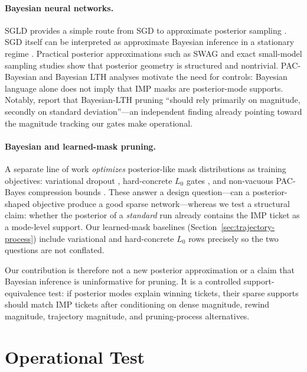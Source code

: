 \documentclass{article}
\begin{document}
\paragraph{Bayesian neural networks.}
SGLD provides a simple route from SGD to approximate posterior sampling
\citep{welling2011sgld}. SGD itself can be interpreted as approximate Bayesian
inference in a stationary regime \citep{mandt2017sgd}. Practical posterior
approximations such as SWAG \citep{maddox2019swag} and exact small-model
sampling studies \citep{izmailov2021posteriors} show that posterior geometry is
structured and nontrivial. PAC-Bayesian and Bayesian LTH analyses
\citep{sakamoto2022pacbayes, kuhn2026bayesian} motivate the need for controls:
Bayesian language alone does not imply that IMP masks are posterior-mode
supports. Notably, \citet{kuhn2026bayesian} report that Bayesian-LTH pruning
``should rely primarily on magnitude, secondly on standard deviation''---an
independent finding already pointing toward the magnitude tracking our gates
make operational.

\paragraph{Bayesian and learned-mask pruning.}
A separate line of work \emph{optimizes} posterior-like mask distributions as
training objectives: variational dropout \citep{molchanov2017variational},
hard-concrete $L_0$ gates \citep{louizos2018l0}, and non-vacuous PAC-Bayes
compression bounds \citep{dziugaite2017nonvacuous}. These answer a design
question---can a posterior-shaped objective produce a good sparse
network---whereas we test a structural claim: whether the posterior of a
\emph{standard} run already contains the IMP ticket as a mode-level support.
Our learned-mask baselines (Section~\ref{sec:trajectory-process}) include
variational and hard-concrete $L_0$ rows precisely so the two questions are
not conflated.

Our contribution is therefore not a new posterior approximation or a claim that
Bayesian inference is uninformative for pruning. It is a controlled
support-equivalence test: if posterior modes explain winning tickets, their
sparse supports should match IMP tickets after conditioning on dense magnitude,
rewind magnitude, trajectory magnitude, and pruning-process alternatives.

\section{Operational Test}
\label{sec:operational-test}
\end{document}

